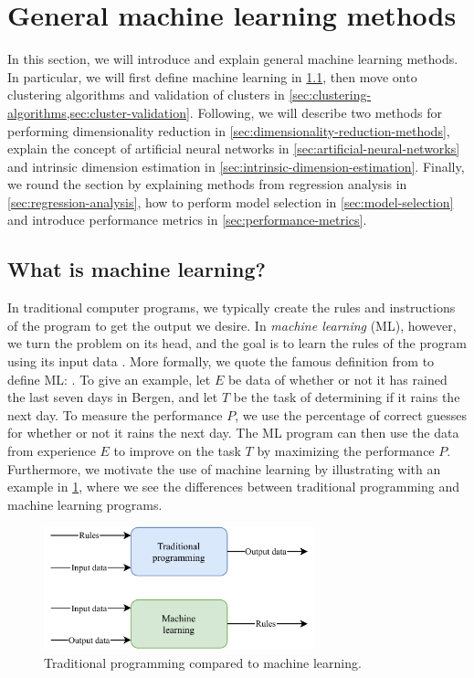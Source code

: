 \section{General machine learning methods}
In this section, we will introduce and explain general machine learning methods. In particular, we will first define machine learning in \cref{sec:what-is-machine-learning}, then move onto clustering algorithms and validation of clusters in \cref{sec:clustering-algorithms,sec:cluster-validation}. Following, we will describe two methods for performing dimensionality reduction in \cref{sec:dimensionality-reduction-methods}, explain the concept of artificial neural networks in \cref{sec:artificial-neural-networks} and intrinsic dimension estimation in \cref{sec:intrinsic-dimension-estimation}. Finally, we round the section by explaining methods from regression analysis in \cref{sec:regression-analysis}, how to perform model selection in \cref{sec:model-selection} and introduce performance metrics in \cref{sec:performance-metrics}.

\subsection{What is machine learning?}
\label{sec:what-is-machine-learning}
In traditional computer programs, we typically create the rules and instructions of the program to get the output we desire. In \textit{machine learning} (ML), however, we turn the problem on its head, and the goal is to learn the rules of the program using its input data \cite{Mitchell1997}. More formally, we quote the famous definition from \cite[p. 2]{Mitchell1997} to define ML: . To give an example, let $E$ be data of whether or not it has rained the last seven days in Bergen, and let $T$ be the task of determining if it rains the next day. To measure the performance $P$, we use the percentage of correct guesses for whether or not it rains the next day. The ML program can then use the data from experience $E$ to improve on the task $T$ by maximizing the performance $P$. Furthermore, we motivate the use of machine learning by illustrating with an example in \cref{fig:ml-versus-tradional-programming}, where we see the differences between traditional programming and machine learning programs.
\begin{figure}[H]
    \centering
    \includegraphics[width=0.7\textwidth]{thesis/figures/ml-versus-tradional-programming_cropped.pdf}
    \caption{Traditional programming compared to machine learning.}
    \label{fig:ml-versus-tradional-programming}
\end{figure}

